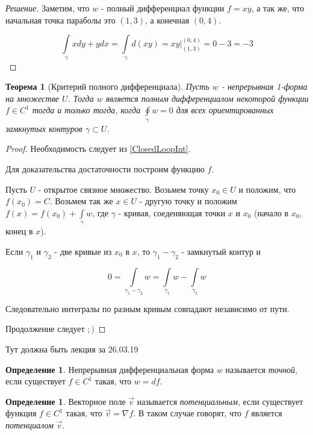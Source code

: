 \documentclass[a5paper]{article}
\newcounter{through}
\theoremstyle{plain}
\newtheorem{theorem}[through]{Теорема}
\theoremstyle{definition}
\newtheorem{definition}[through]{Определение}
\numberwithin{through}{section}
\numberwithin{equation}{section}
\begin{document}
\begin{proof}[Решение]
	Заметим, что $w$ - полный дифференциал функции $f=xy$, а так же, что начальная точка параболы это $(1, 3)$, а конечная $(0, 4)$.
	
	\begin{equation*}
		\int\limits_{\gamma} xdy + ydx = \int\limits_{\gamma} d(xy) = xy \bigg|_{(1, 3)}^{(0, 4)} = 0 - 3 = -3
	\end{equation*}
\end{proof}

\begin{theorem}[Критерий полного дифференциала]
	Пусть $w$ - непрерывная 1-форма на множестве $U$. Тогда $w$ является полным дифференциалом некоторой функции $f \in C^1$ тогда и только тогда, когда $\oint\limits_{\gamma} w = 0$ для всех ориентированных замкнутых контуров $\gamma \subset U$.
\end{theorem}

\begin{proof}
	Необходимость следует из \ref{ClosedLoopInt}.
	
	Для доказательства достаточности построим функцию $f$. 
	
	Пусть $U$ - открытое связное множество. Возьмем точку $x_0 \in U$ и положим, что $f(x_0)=C$. Возьмем так же $x \in U$ - другую точку и положим $f(x)=f(x_0)+\int\limits_{\gamma} w$, где $\gamma$ - кривая, соеденяющая точки $x$ и $x_0$ (начало в $x_0$, конец в $x$). 
	
	Если $\gamma_1$ и $\gamma_2$ - две кривые из $x_0$ в $x$, то $\gamma_1 - \gamma_2$ - замкнутый контур и 
	
	\begin{equation*}
		0 = \int\limits_{\gamma_1 - \gamma_2}w = \int\limits_{\gamma_1} w - \int\limits_{\gamma_2} w
	\end{equation*}
	
	Следовательно интегралы по разным кривым совпадают независимо от пути.
	
	Продолжение следует $;)$
\end{proof}

Тут должна быть лекция за 26.03.19 %

\begin{definition}
	Непрерывная дифференциальная форма $w$ называется \textit{точной}, если существует
	$f \in C^1$ такая, что $ w = df$.
\end{definition}

\begin{definition}
	Векторное поле $\vec{v}$ называется \textit{потенциальным}, если существует функция $f \in C^1$ 
	такая, что $\vec{v} = \nabla f$. В таком случае говорят, что $f$ является \textit{потенциалом}
	$\vec{v}$.
\end{definition}
\end{document}
